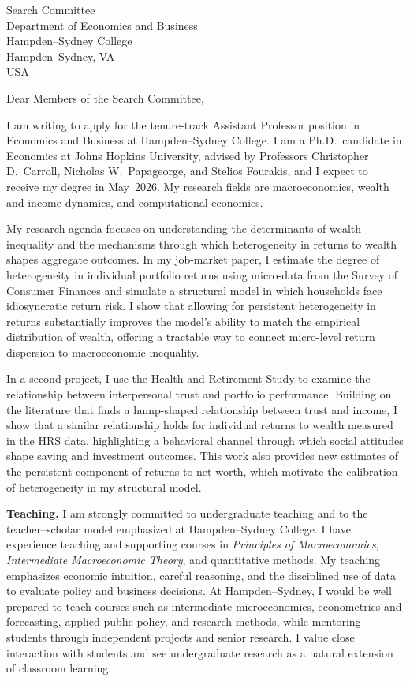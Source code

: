 \documentclass[11pt,letterpaper]{letter}
\begin{document}
\begin{letter}{Search Committee \\
Department of Economics and Business \\
Hampden--Sydney College \\
Hampden--Sydney, VA \\ USA}

\opening{Dear Members of the Search Committee,}

I am writing to apply for the tenure-track Assistant Professor position in Economics and Business at Hampden--Sydney College. I am a Ph.D.\ candidate in Economics at Johns Hopkins University, advised by Professors Christopher D.~Carroll, Nicholas W.~Papageorge, and Stelios Fourakis, and I expect to receive my degree in May~2026. My research fields are macroeconomics, wealth and income dynamics, and computational economics.

My research agenda focuses on understanding the determinants of wealth inequality and the mechanisms through which heterogeneity in returns to wealth shapes aggregate outcomes. In my job-market paper, I estimate the degree of heterogeneity in individual portfolio returns using micro-data from the Survey of Consumer Finances and simulate a structural model in which households face idiosyncratic return risk. I show that allowing for persistent heterogeneity in returns substantially improves the model’s ability to match the empirical distribution of wealth, offering a tractable way to connect micro-level return dispersion to macroeconomic inequality.

In a second project, I use the Health and Retirement Study to examine the relationship between interpersonal trust and portfolio performance. Building on the literature that finds a hump-shaped relationship between trust and income, I show that a similar relationship holds for individual returns to wealth measured in the HRS data, highlighting a behavioral channel through which social attitudes shape saving and investment outcomes. This work also provides new estimates of the persistent component of returns to net worth, which motivate the calibration of heterogeneity in my structural model.

\textbf{Teaching.} I am strongly committed to undergraduate teaching and to the teacher–scholar model emphasized at Hampden--Sydney College. I have experience teaching and supporting courses in \textit{Principles of Macroeconomics}, \textit{Intermediate Macroeconomic Theory}, and quantitative methods. My teaching emphasizes economic intuition, careful reasoning, and the disciplined use of data to evaluate policy and business decisions. At Hampden--Sydney, I would be well prepared to teach courses such as intermediate microeconomics, econometrics and forecasting, applied public policy, and research methods, while mentoring students through independent projects and senior research. I value close interaction with students and see undergraduate research as a natural extension of classroom learning.


\end{letter}
\end{document}
